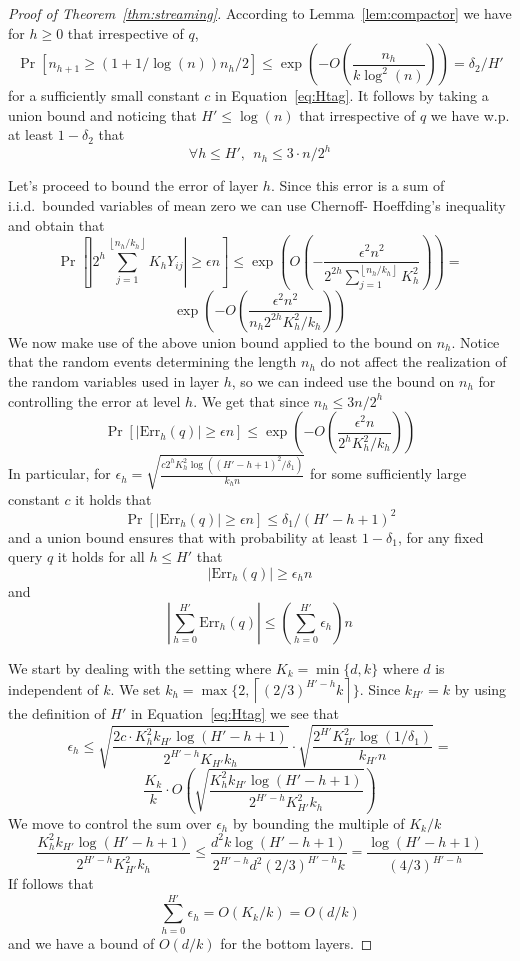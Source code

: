 \documentclass[anon,12pt]{colt2019} %
\newcommand{\eps}{\epsilon}
\newcommand{\floor}[1]{\left \lfloor #1 \right \rfloor}
\newcommand{\ceil}[1]{\left \lceil #1 \right \rceil}
\renewcommand{\Pr}{\operatorname{Pr}}
\begin{document}
\begin{proof} [Proof of Theorem~\ref{thm:streaming}]
According to Lemma~\ref{lem:compactor} we have for $ h\geq 0$ that irrespective of $q$,
$$ \Pr[n_{h+1} \geq (1+1/\log(n))n_{h}/2] \leq \exp\left( -O\left(\frac{n_{h}}{k \log^2(n)} \right) \right) = \delta_2 / H' $$
for a sufficiently small constant $c$ in Equation~\eqref{eq:Htag}. 
It follows by taking a union bound and noticing that $H' \leq \log(n)$ that irrespective of $q$ we have w.p. at least $1-\delta_2$ that 
$$\forall h \leq H', \ \ n_{h} \leq 3 \cdot n/2^{h}$$

Let's proceed to bound the error of layer $h$. Since this error is a sum of i.i.d.\ bounded variables of mean zero we can use Chernoff- Hoeffding's inequality and obtain that
$$ \Pr\left[   \left| 2^h \sum_{j=1}^{\floor{n_h/k_h} } K_h Y_{ij} \right| \geq \eps n \right] \leq \exp \left( O\left( -\frac{ \eps^2 n^2}{ 2^{2h} \sum_{j=1}^{\floor{n_h/k_h} } K_h^2}   \right)\right) =$$
$$\exp \left( -O\left(\frac{\eps^2 n^2}{n_h 2^{2h} K_h^2/k_h  } \right) \right) 
$$
We now make use of the above union bound applied to the bound on $n_h$. Notice that the random events determining the length $n_h$ do not affect the realization of the random variables used in layer $h$, so we can indeed use the bound on $n_h$ for controlling the error at level $h$. We get that since $n_h \leq 3n/2^h$
$$ \Pr\left[   \left| \text{Err}_h(q) \right| \geq \eps n \right] \leq 
\exp \left( -O\left(\frac{\eps^2 n}{ 2^h K_h^2/k_h  } \right) \right) 
$$
In particular, for $\eps_h = \sqrt{\frac{c 2^h K_h^2 \log((H'-h+1)^2/\delta_1)}{k_h n}}$ for some sufficiently large constant $c$ it holds that
$$ \Pr\left[   \left| \text{Err}_h(q) \right| \geq \eps n \right] \leq \delta_1/(H'-h+1)^2$$
and a union bound ensures that with probability at least $1-\delta_1$, for any fixed query $q$ it holds for all $h \leq H'$ that
$$\left| \text{Err}_h(q) \right| \geq \eps_h n$$
and 
$$\left| \sum_{h=0}^{H'} \text{Err}_h(q) \right| \leq \left(\sum_{h=0}^{H'} \eps_h\right)n $$

We start by dealing with the setting where $K_k = \min\{d,k\}$ where $d$ is independent of $k$. We set $k_h = \max\{2, \ceil{(2/3)^{H'-h}k}\}$. Since $k_{H'} = k$ by using the definition of $H'$ in Equation~\eqref{eq:Htag} we see that
$$\eps_h \leq \sqrt{\frac{2c \cdot K_h^2 k_{H'}\log(H'-h+1)}{2^{H'-h} K_{H'} k_{h}}} \cdot \sqrt{\frac{2^{H'} K_{H'}^2 \log(1/\delta_1)}{k_{H'} n}} = $$
$$
\frac{K_k}{k} \cdot O\left( \sqrt{\frac{K_h^2 k_{H'}\log(H'-h+1)}{2^{H'-h} K_{H'}^2 k_{h}}}  \right)
$$ 
We move to control the sum over $\eps_h$ by bounding the multiple of $K_k/k$
$$
\frac{K_h^2 k_{H'}\log(H'-h+1)}{2^{H'-h} K_{H'}^2 k_{h}} \leq \frac{d^2 k\log(H'-h+1)}{2^{H'-h} d^2 (2/3)^{H'-h}k} =
\frac{\log(H'-h+1)}{ (4/3)^{H'-h}}
$$
If follows that 
$$ \sum_{h=0}^{H'} \eps_h = O(K_k/k) = O(d/k) $$
and we have a bound of $O(d/k)$ for the bottom layers.


\end{proof}
\end{document}

